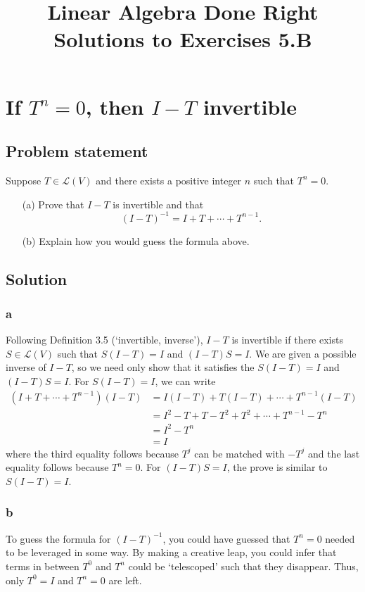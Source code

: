 \documentclass{article}
\title{Linear Algebra Done Right\\Solutions to Exercises 5.B}
\author{}
\date{}
\begin{document}
\maketitle

\section{If $T^n=0$, then $I-T$ invertible}
\subsection*{Problem statement}
Suppose $T\in\mathcal{L}(V)$ and there exists a positive integer $n$ such that $T^n=0$.
\begin{enumerate}
    \item[(a)] Prove that $I-T$ is invertible and that \[(I-T)^{-1}=I+T+\cdots+T^{n-1}.\]
    \item[(b)] Explain how you would guess the formula above.
\end{enumerate}

\subsection*{Solution}
\subsubsection*{a}
Following Definition 3.5 (`invertible, inverse'), $I-T$ is invertible if there exists $S\in\mathcal{L}(V)$ such that $S(I-T)=I$ and $(I-T)S=I$. 
We are given a possible inverse of $I-T$, so we need only show that it satisfies the $S(I-T)=I$ and $(I-T)S=I$. 
For $S(I-T)=I$, we can write
\begin{align*}
    (I+T+\cdots+T^{n-1})(I-T)&=I(I-T)+T(I-T)+\cdots+T^{n-1}(I-T)\\
    &= I^2-T+T-T^2+T^2+\cdots+T^{n-1}-T^n\\
    &=I^2-T^n\\
    &=I
\end{align*}
where the third equality follows because $T^j$ can be matched with $-T^j$ and the last equality follows because $T^n=0$.
For $(I-T)S=I$, the prove is similar to $S(I-T)=I$.

\subsubsection*{b}
To guess the formula for $(I-T)^{-1}$, you could have guessed that $T^n=0$ needed to be leveraged in some way. 
By making a creative leap, you could infer that terms in between $T^0$ and $T^n$ could be `telescoped' such that they disappear.
Thus, only $T^0=I$ and $T^n=0$ are left.
\end{document}

